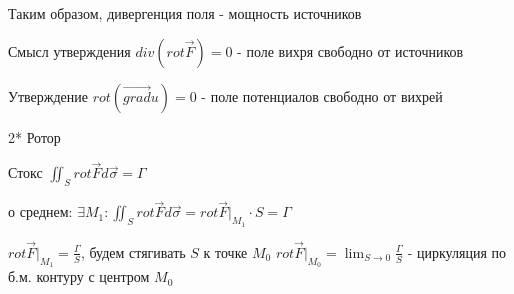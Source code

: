 \documentclass[12pt]{article}
\begin{document}
    Таким образом, дивергенция поля - мощность источников

    \Nota Смысл утверждения $div (rot \overrightarrow F) = 0$ - поле вихря свободно от источников

    \Nota Утверждение $rot (\overrightarrow{grad} u) = 0$ - поле потенциалов свободно от вихрей

    \mediumvspace

    \hypertarget{rotormechanicalmeaning}{}

    2* Ротор

    Стокс $\iint_S rot \overrightarrow{F} d\overrightarrow{\sigma} = \Gamma$

    \Ths о среднем: $\exists M_1 : \iint_S rot \overrightarrow{F} d\overrightarrow{\sigma} = rot \overrightarrow{F} \Big|_{M_1} \cdot S = \Gamma$

    $rot \overrightarrow{F} \Big|_{M_1} = \frac{\Gamma}{S}$, будем стягивать $S$ к точке $M_0$ \Longrightarrow $rot \overrightarrow{F} \Big|_{M_0} = \lim_{S \to 0} \frac{\Gamma}{S}$ - циркуляция по б.м. контуру с центром $M_0$
\end{document}
